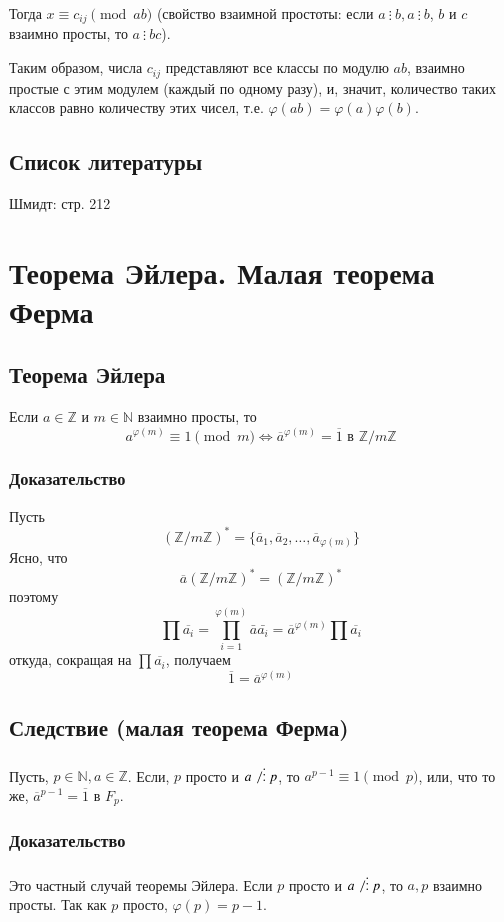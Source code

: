 \documentclass{article}
\newcommand{\divs}{~\vdots~}
\begin{document}
Тогда $x \equiv c_{ij} \pmod{ab}$ (свойство взаимной простоты: если $a \divs b, a \divs b$, $b$ и $c$ взаимно просты, то $a \divs bc$).

Таким образом, числа $c_{ij}$ представляют все классы по модулю $ab$, взаимно простые с этим модулем (каждый по одному разу), и, значит, количество таких классов равно количеству этих чисел, т.е. $\varphi(ab) = \varphi(a)\varphi(b)$.

\subsection*{Список литературы}
Шмидт: стр. 212


\newpage
\section{Теорема Эйлера. Малая теорема Ферма}
\subsection{Теорема Эйлера}
Если $a \in \mathbb Z$ и $m \in \mathbb N$ взаимно просты, то
\[a^{\varphi(m)} \equiv 1 \pmod{m} \Leftrightarrow \overline{a}^{\varphi(m)} = \overline 1 \text{ в } \mathbb Z /m \mathbb Z\]

\subsubsection*{Доказательство}
Пусть \[(\mathbb Z/m \mathbb Z)^* = \{\overline{a}_1, \overline{a}_2, \dots, \overline{a}_{\varphi(m)}\}\] Ясно, что \[\overline{a}(\mathbb Z/m \mathbb Z)^* = (\mathbb Z/m \mathbb Z)^*\] поэтому \[\prod \overline{a_i} = \prod_{i=1}^{\varphi(m)} \bar{a} \bar{a_i} = \overline{a}^{\varphi(m)} \prod \overline{a_i}\] откуда, сокращая на $\prod \overline{a_i}$, получаем \[\overline{1} = \overline{a}^{\varphi(m)}\]

\subsection{Следствие (малая теорема Ферма)}
Пусть, $p \in \mathbb N, a \in \mathbb Z$. Если, $p$ просто и $a \not \divs p$, то $a^{p-1} \equiv 1 \pmod{p}$, или, что то же, $\overline{a}^{p-1} = \overline{1} \text{ в } F_p$.

\subsubsection*{Доказательство}
Это частный случай теоремы Эйлера. Если $p$ просто и $a \not \divs p$, то $a, p$ взаимно просты. Так как $p$ просто, $\varphi(p) = p-1$.
\end{document}
